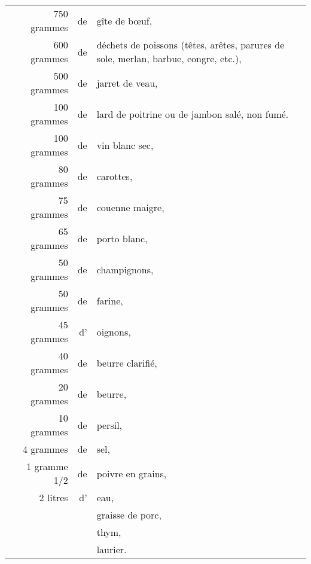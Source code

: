 \footnotesize
\begin{longtable}{rrrrp{16em}}
  & \multicolumn{2}{r}{ 750 grammes} & de & gîte de bœuf,                                                 \\
  & \multicolumn{2}{r}{ 600 grammes} & de & déchets de poissons (têtes, arêtes, parures de sole, merlan,
                                            barbue, congre, etc.),                                        \\
  & \multicolumn{2}{r}{ 500 grammes} & de & jarret de veau,                                               \\
  & \multicolumn{2}{r}{ 100 grammes} & de & lard de poitrine ou de jambon salé, non fumé.                 \\
  & \multicolumn{2}{r}{ 100 grammes} & de & vin blanc sec,                                                \\
  & \multicolumn{2}{r}{  80 grammes} & de & carottes,                                                     \\
  & \multicolumn{2}{r}{  75 grammes} & de & couenne maigre,                                               \\
  & \multicolumn{2}{r}{  65 grammes} & de & porto blanc,                                                  \\
  & \multicolumn{2}{r}{  50 grammes} & de & champignons,                                                  \\
  & \multicolumn{2}{r}{  50 grammes} & de & farine,                                                       \\
  & \multicolumn{2}{r}{  45 grammes} & d' & oignons,                                                      \\
  & \multicolumn{2}{r}{  40 grammes} & de & beurre clarifié,                                              \\
  & \multicolumn{2}{r}{  20 grammes} & de & beurre,                                                       \\
  & \multicolumn{2}{r}{  10 grammes} & de & persil,                                                       \\
  & \multicolumn{2}{r}{   4 grammes} & de & sel,                                                          \\
  & \multicolumn{2}{r}{   1 gramme 1/2} & de & poivre en grains,                                          \\
  &     & 2 litres    & d' & eau,                                                                         \\
  &     &             &    & graisse de porc,                                                             \\
  &     &             &    & thym,                                                                        \\
  &     &             &    & laurier.                                                                     \\
\end{longtable}
\normalsize

